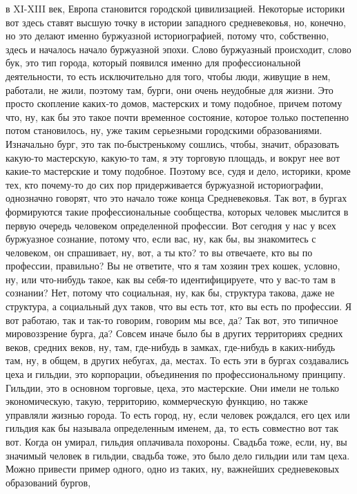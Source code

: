 в XI-XIII век, Европа становится
городской цивилизацией. Некоторые историки вот здесь
ставят высшую точку в истории западного средневековья, но, конечно, но это
делают именно буржуазной историографией, потому что, собственно, здесь и
началось начало буржуазной эпохи. Слово буржуазный происходит, слово бук, это
тип города, который появился именно для профессиональной деятельности, то есть
исключительно для того, чтобы люди, живущие в нем, работали, не жили, поэтому
там, бурги, они очень неудобные для жизни. Это просто скопление каких-то домов,
мастерских и тому подобное, причем потому что, ну, как бы это такое почти
временное состояние, которое только постепенно потом становилось, ну, уже таким
серьезными городскими образованиями. Изначально бург, это так по-быстренькому
сошлись, чтобы, значит, образовать какую-то мастерскую, какую-то там, я эту
торговую площадь, и вокруг нее вот какие-то мастерские и тому подобное. Поэтому
все, судя и дело, историки, кроме тех, кто почему-то до сих пор придерживается
буржуазной историографии, однозначно говорят, что это начало тоже конца
Средневековья. Так вот, в бургах формируются такие профессиональные сообщества,
которых человек мыслится в первую очередь человеком определенной профессии. Вот
сегодня у нас у всех буржуазное сознание, потому что, если вас, ну, как бы, вы
знакомитесь с человеком, он спрашивает, ну, вот, а ты кто? то вы отвечаете, кто
вы по профессии, правильно? Вы не ответите, что я там хозяин трех кошек,
условно, ну, или что-нибудь такое, как вы себя-то идентифицируете, что у вас-то
там в сознании? Нет, потому что социальная, ну, как бы, структура такова, даже
не структура, а социальный дух таков, что вы есть тот, кто вы есть по профессии.
Я вот работаю, так и так-то говорим, говорим мы все, да? Так вот, это типичное
мировоззрение бурга, да? Совсем иначе было бы в других территориях средних
веков, средних веков, ну, там, где-нибудь в замках, где-нибудь в каких-нибудь
там, ну, в общем, в других небугах, да, местах. То есть эти в бургах создавались
цеха и гильдии, это корпорации, объединения по профессиональному принципу.
Гильдии, это в основном торговые, цеха, это мастерские. Они имели не только
экономическую, такую, территорию, коммерческую функцию, но также управляли
жизнью города. То есть город, ну, если человек рождался, его цех или гильдия как
бы называла определенным именем, да, то есть совместно вот так вот. Когда он
умирал, гильдия оплачивала похороны. Свадьба тоже, если, ну, вы значимый человек
в гильдии, свадьба тоже, это было дело гильдии или там цеха. Можно привести
пример одного, одно из таких, ну, важнейших средневековых образований бургов,
